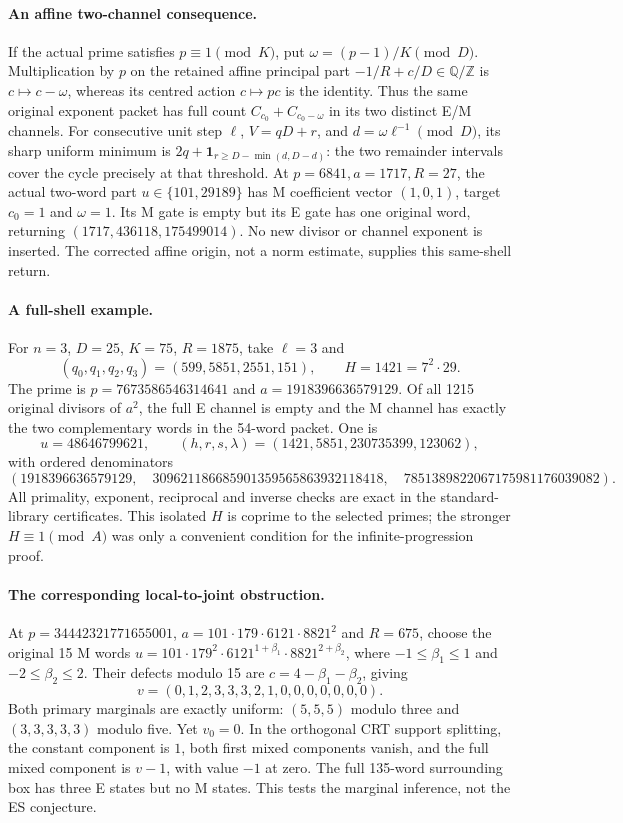 \documentclass[10pt]{article}
\begin{document}
\paragraph{An affine two-channel consequence.}
If the actual prime satisfies $p\equiv1\pmod K$, put
$\omega=(p-1)/K\pmod D$. Multiplication by $p$ on the retained affine
principal part $-1/R+c/D\in\mathbb Q/\mathbb Z$ is
$c\mapsto c-\omega$, whereas its centred action $c\mapsto pc$ is the
identity. Thus the same original exponent packet has full count
$C_{c_0}+C_{c_0-\omega}$ in its two distinct E/M channels. For consecutive
unit step $\ell$, $V=qD+r$, and $d=\omega\ell^{-1}\pmod D$, its sharp
uniform minimum is $2q+\mathbf1_{r\ge D-\min(d,D-d)}$: the two remainder
intervals cover the cycle precisely at that threshold.
At $p=6841,a=1717,R=27$, the actual two-word part
$u\in\{101,29189\}$ has M coefficient vector $(1,0,1)$, target $c_0=1$
and $\omega=1$. Its M gate is empty but its E gate has one original word,
returning $(1717,436118,175499014)$. No new divisor or channel exponent is
inserted. The corrected affine origin, not a norm estimate, supplies this
same-shell return.

\paragraph{A full-shell example.}
For $n=3$, $D=25$, $K=75$, $R=1875$, take $\ell=3$ and
\[
 (q_0,q_1,q_2,q_3)=(599,5851,2551,151),\qquad H=1421=7^2\cdot29.
\]
The prime is $p=7673586546314641$ and $a=1918396636579129$. Of all 1215
original divisors of $a^2$, the full E channel is empty and the M channel
has exactly the two complementary words in the 54-word packet. One is
\[
 u=48646799621,\qquad(h,r,s,\lambda)=(1421,5851,230735399,123062),
\]
with ordered denominators
\[
 (1918396636579129,\quad309621186685901359565863932118418,
 \quad7851389822067175981176039082).
\]
All primality, exponent, reciprocal and inverse checks are exact in the
standard-library certificates. This isolated $H$ is coprime to the selected
primes; the stronger $H\equiv1\pmod A$ was only a convenient condition for
the infinite-progression proof.

\paragraph{The corresponding local-to-joint obstruction.}
At $p=34442321771655001$, $a=101\cdot179\cdot6121\cdot8821^2$ and
$R=675$, choose the original 15 M words
$u=101\cdot179^2\cdot6121^{1+\beta_1}\cdot8821^{2+\beta_2}$,
where $-1\le\beta_1\le1$ and $-2\le\beta_2\le2$.
Their defects modulo 15 are $c=4-\beta_1-\beta_2$, giving
\[
 v=(0,1,2,3,3,3,2,1,0,0,0,0,0,0,0).
\]
Both primary marginals are exactly uniform: $(5,5,5)$ modulo three and
$(3,3,3,3,3)$ modulo five. Yet $v_0=0$. In the orthogonal CRT support
splitting, the constant component is $1$, both first mixed components
vanish, and the full mixed component is $v-1$, with value $-1$ at zero.
The full 135-word surrounding box has three E states but no M states.
This tests the marginal inference, not the ES conjecture.
\end{document}
